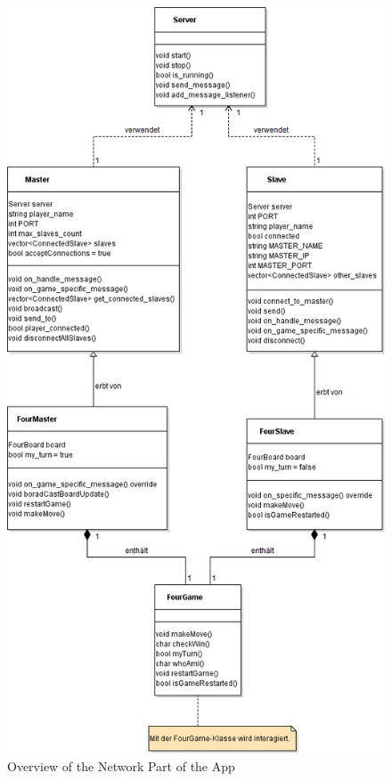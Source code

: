 \begin{figure}
  \includegraphics[height=\textheight]{UML/NetzwerkUML.png}
  \caption{Overview of the Network Part of the App}
\end{figure}
